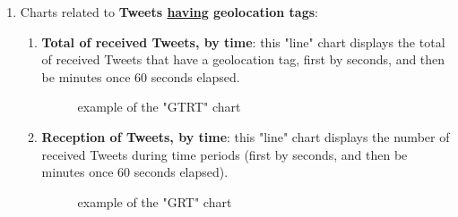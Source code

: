 \documentclass[a4paper,11pt]{report}
\begin{document}
\begin{enumerate}
	\item Charts related to \textbf{Tweets \underline{having} geolocation tags}:
	\begin{enumerate}
		\item \textbf{Total of received Tweets, by time}: this "line" chart displays the total of received Tweets that have a geolocation tag, first by seconds, and then be minutes once 60 seconds elapsed.
		\begin{figure}[H]
		\vspace{-5pt}
		\begin{center}
		\vspace{-5pt}
		\caption{example of the "GTRT" chart}
		\end{center}
		\end{figure}
		\vspace{-10pt}
		
		\item \textbf{Reception of Tweets, by time}: this "line" chart displays the number of received Tweets during time periods (first by seconds, and then be minutes once 60 seconds elapsed).
		\begin{figure}[H]
		\vspace{-5pt}
		\begin{center}
		\vspace{-5pt}
		\caption{example of the "GRT" chart}
		\end{center}
		\end{figure}
		\vspace{-10pt}
		

\end{enumerate}
\end{enumerate}
\end{document}
